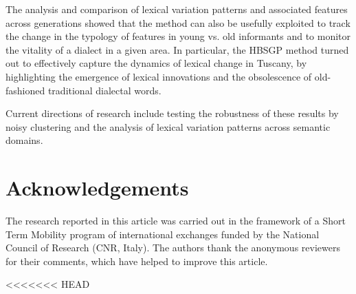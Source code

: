 \documentclass[output=paper]{LSP/langsci}
\begin{document}
The analysis and comparison of lexical variation patterns and associated features across generations showed that the method can also be usefully exploited to track the change in the typology of features in young vs. old informants and to monitor the vitality of a dialect in a given area. In particular, the HBSGP method turned out to effectively capture the dynamics of lexical change in Tuscany, by highlighting the emergence of lexical innovations and the obsolescence of old-fashioned traditional dialectal words. 

Current directions of research include testing the robustness of these results by noisy clustering and the analysis of lexical variation patterns across semantic domains.

\section*{Acknowledgements}
The research reported in this article was carried out in  the framework  of  a  Short  Term  Mobility  program   of international   exchanges   funded   by   the National Council of Research (CNR, Italy). The authors thank the anonymous reviewers for their comments,  which  have  helped  to  improve  this  article.


\printbibliography[heading=subbibliography,notkeyword=this]
<<<<<<< HEAD
\end{document}

